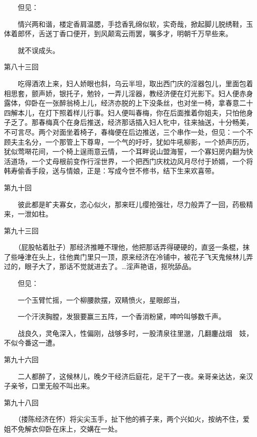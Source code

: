 　　但见：

　　情兴两和谐，楼定香肩温腮，手捻香乳绵似软，实奇哉，掀起脚儿脱绣鞋，玉体着郎怀，舌送丁香口便开，到风颠鸾云雨罢，嘱多才，明朝千万早些来。


　　就不误成头。


第八十三回

　　吃得酒浓上来，妇人娇眼也斜，乌云半坦，取出西门庆的淫器包儿，里面包着相思套，颤声娇，银托子，勉铃，一弄儿淫器，教经济便在灯光影下。妇人便赤身露体，仰卧在一张醉翁椅上儿，经济亦脱的上下没条丝，也对坐一椅，拿春意二十四解本儿，在灯下照着样儿行事。妇人便叫春梅，你在后面推着你姐夫，只怕他身子乏了。那春梅真个在身后推送，经济那话插入妇人牝中，往来抽送，十分畅美，不可言尽。两个对面坐着椅子，春梅便在后边推送，三个串作一处，但见：一个不顾夫主名分，一个那管上下尊卑，一个气的吁吁，犹如牛吼柳影，一个娇声历历，犹似莺啭花间，一个椅上逞雨意云情，一个耳畔说山盟海誓，一个寡妇房内翻为快活道场，一个丈母根前变作行淫世界，一个把西门庆枕边风月尽付于娇婿，一个将韩寿偷香手段，送与情娘，正是：写成今世不修书，结下生来欢喜带。


第九十回

　　彼此都是旷夫寡女，恣心似火，那来旺儿缨抢强壮，尽力般弄了一回，药极精来，一泄如柱。


第九十三回

　　（屁股帖着肚子）那经济推睡不理他，他把那话弄得硬硬的，直竖一条棍，抹了些唾津在头上，往他粪门里只一顶，原来经济在冷铺中，被花子飞天鬼候林儿弄过的，眼子大了，那话不觉就进去了。…淫声艳语，抠吮舔品。


　　但见：

　　一个玉臂忙摇，一个柳腰款摆，双睛愤火，星眼郎当，

　　一个汗浃胸膛，发狠要赢三五阵，一个香消粉黛，呻吟叫够数千声。

　　战良久，灵龟深入，性偏刚，战够多时，一股清泉往里邈，几翻鏖战烟　妓，不似今番这一遭。


第九十六回

　　二人都醉了，这候林儿，晚夕干经济后庭花，足干了一夜。亲哥亲达达，亲汉子亲爷，口里无般不叫出来。


第九十八回

　　（搂陈经济在怀）将尖尖玉手，扯下他的裤子来，两个兴如火，按纳不住，爱姐不免解衣仰卧在床上，交媾在一处。
